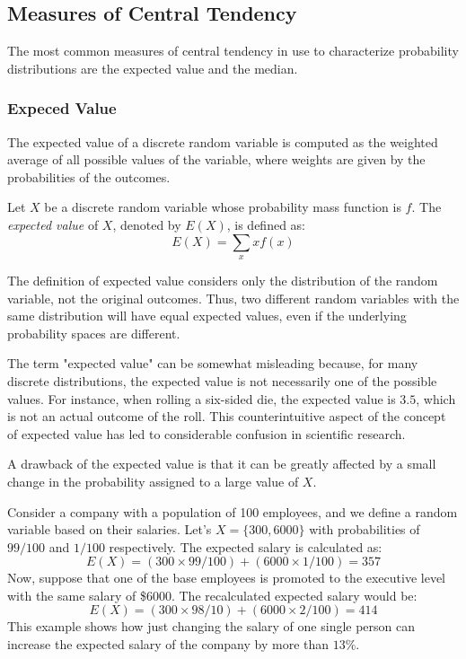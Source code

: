 
\subsection{Measures of Central Tendency}

The most common measures of central tendency in use to characterize probability distributions are the expected value and the median.


\subsubsection*{Expeced Value}

The expected value of a discrete random variable is computed as the weighted average of all possible values of the variable, where weights are given by the probabilities of the outcomes.

\begin{definition}\label{probability:expectation}
Let $X$ be a discrete random variable whose probability mass function is $f$. The \emph{expected value} of $X$, denoted by $E\left(X\right)$, is defined as:
\[
E\left(X\right)=\sum_{x}xf\left(x\right)
\]
\end{definition}

The definition of expected value considers only the distribution of the random variable, not the original outcomes. Thus, two different random variables with the same distribution will have equal expected values, even if the underlying probability spaces are different.

The term "expected value" can be somewhat misleading because, for many discrete distributions, the expected value is not necessarily one of the possible values. For instance, when rolling a six-sided die, the expected value is \(3.5\), which is not an actual outcome of the roll. This counterintuitive aspect of the concept of expected value has led to considerable confusion in scientific research.

A drawback of the expected value is that it can be greatly affected by a small change in the probability assigned to a large value of $X$.

\begin{example}\label{ex:expected_salary}
Consider a company with a population of 100 employees, and we define a random variable based on their salaries. Let's $X = \{300, 6000\}$ with probabilities of $99/100$ and $1/100$ respectively. The expected salary is calculated as:
\[ 
E\left(X\right) = (300 \times 99/100) + (6000 \times 1/100) = 357
\]
Now, suppose that one of the base employees is promoted to the executive level with the same salary of \$6000. The recalculated expected salary would be:
\[
E\left(X\right) = (300 \times 98/10) + (6000 \times 2/100) = 414
\]
This example shows how just changing the salary of one single person can increase the expected salary of the company by more than $13\%$.
\end{example}

